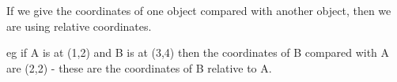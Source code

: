 If we give the coordinates of one object compared with another object,
then we are using relative coordinates.
\par
eg if A is at (1,2) and B is at (3,4) then the coordinates of B compared
with A are (2,2) - these are the coordinates of B relative to A.